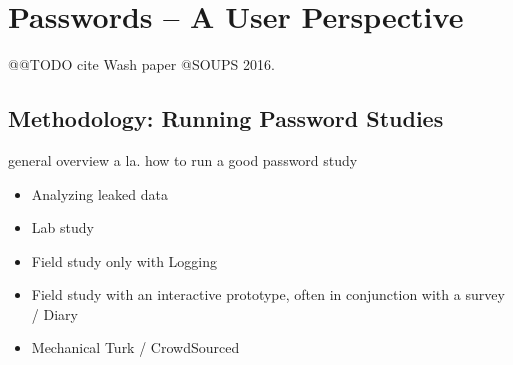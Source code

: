 \chapter[Passwords -- A User Perspective]{Passwords -- A User Perspective}\label{chap:rw:user_perspective}






@@TODO cite Wash paper @SOUPS 2016.

\cite{Bailey2014StatisticsReuse,Bojinov2010KamouflagePWM,Bonneau2015SecretsLies,Brown2004GeneratingPWs,Chiasson2009InterferencesGraphical,Conklin2004PWAuthenticationSystemPerspective,CSID2012PasswordHabits,Das2014TangledWeb,Dourish2004UserStrategiesEveryday,Florencio2014PasswordPortfoliosFiniteUser,Forget2015CYOA}
\cite{Gaw2005ReuseRecycle,Gaw2006PasswordManagement,Habib2017Blacklists,Haque2014Hierarchy,Hayashi2011DiaryStudyPWs,Huha2015UserReplaceablePasswords,Ives2004DominoEffectReuse,Katsini2017StrategiesGraphicalPasswords,Keith2009PassphraseDesign,Komanduri2011OfPasswordsAndPeople,Kothari2017PasswordLogbooks,Kuo2006HumanSelectionMnemonic,Li2017,Loutfi2015PasswordsOtherSideOfTheFence,Lyastani2016PWMangling,Notoatmodjo2007,Peisert2013PriciplesAuthentication,Riley2006WhatUsersKnowWhatTheyDo}
\cite{Shay2014ReligiousAunt,Shay2010EncounteringPasswordRequirements,Singh2007PasswordSharing,Stobert2014a,Stobert2015,Stobert2014PWMThatDoesntRemember,Stobert2014PasswordLifeCycle,Stobert2015ExpertPassword}
\cite{Ur2015PWCreationLab,Bruggen2013ModifiyngUnlockingBehavior,Veras2012VisualizingSemanticsPasswords,Wang2015ChinesePWs,Wash2016UnderstandingPasswordChoices,Yang2016MnemonicSentenceBased,ZhangKennedy2016RevisitingPasswordRules}

\section{Methodology: Running Password Studies}

general overview a la. how to run a good password study 

\cite{Krol2016ExperimentDesign,Peer2017,Consolvo2003,Ross2010,Sotirakopoulos2011,Oppenheimer2009InstructionalManipulationChecks,Harbach2016HardLockLife,Barbera2013,Carreras2013,Chamberlain2012ResearchInTheWild,Henze2013EmpiricalResearchUbiquitous,Kuhn1993,VonZezschwitz2013SurvivalShortest,Hassenzahl2003,Mazurek2013Measuring,Egelman2015a,Rosoff2014,Savage2012}

\begin{itemize}
	\item Analyzing leaked data
	\item Lab study \cite{Sotirakopoulos2011}
	\item Field study only with Logging \cite{Florencio2007LargeScaleStudyPasswordHabits}
	\item Field study with an interactive prototype, often in conjunction with a survey / Diary 
	\item Mechanical Turk / CrowdSourced 
\end{itemize}

